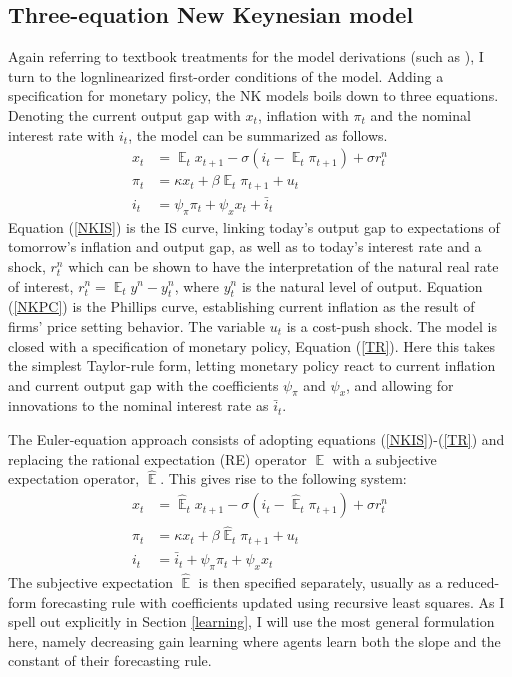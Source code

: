\documentclass[11pt]{article}
\renewcommand{\[}{\begin{equation}}
\renewcommand{\]}{\end{equation}}
\DeclareMathOperator{\E}{\mathbb{E}}
\begin{document}
\subsection{Three-equation New Keynesian model}
Again referring to textbook treatments for the model derivations (such as \cite{woodford2011interest}), I turn to the lognlinearized first-order conditions of the model. Adding a specification for monetary policy, the NK models boils down to three equations. Denoting the current output gap with $x_t$, inflation with $\pi_t$ and the nominal interest rate with $i_t$, the model can be summarized as follows.
\begin{align}
x_t &= \E_t x_{t+1} - \sigma(i_t - \E_t \pi_{t+1}) +\sigma r_t^n \label{NKIS} \\
\pi_t &= \kappa x_t +\beta \E_t \pi_{t+1} + u_t  \label{NKPC} \\
i_t &= \psi_{\pi}\pi_t + \psi_{x} x_t + \bar{i}_t \label{TR}
\end{align}
Equation (\ref{NKIS}) is the IS curve, linking today's output gap to expectations of tomorrow's inflation and output gap, as well as to today's interest rate and a shock, $r_t^n$ which can be shown to have the interpretation of the natural real rate of interest, $r_t^n = \E_t y^n - y_t^n$, where $y^n_t$ is the natural level of output. Equation (\ref{NKPC}) is the Phillips curve, establishing current inflation as the result of firms' price setting behavior. The variable $u_t$ is a cost-push shock. The model is closed with a specification of monetary policy, Equation (\ref{TR}). Here this takes the simplest Taylor-rule form, letting monetary policy react to current inflation and current output gap with the coefficients $\psi_{\pi}$ and $\psi_x$, and allowing for innovations to the nominal interest rate as $\bar{i}_t$.

The Euler-equation approach consists of adopting equations (\ref{NKIS})-(\ref{TR}) and replacing the rational expectation (RE) operator $\E$ with a subjective expectation operator, $\hat{\E}$. This gives rise to the following system:
\begin{align}
x_t &= \hat{\E}_t x_{t+1} - \sigma(i_t - \hat{\E}_t \pi_{t+1}) +\sigma r_t^n \label{prestons13} \\
\pi_t &= \kappa x_t +\beta \hat{\E}_t \pi_{t+1} + u_t \label{prestons14}  \\
i_t &= \bar{i}_t + \psi_{\pi}\pi_t + \psi_{x} x_t 
\end{align}
The subjective expectation $\hat{\E}$ is then specified separately, usually as a reduced-form forecasting rule with coefficients updated using recursive least squares. As I spell out explicitly in Section \ref{learning}, I will use the most general formulation here, namely decreasing gain learning where agents learn both the slope and the constant of their forecasting rule. 
\end{document}
